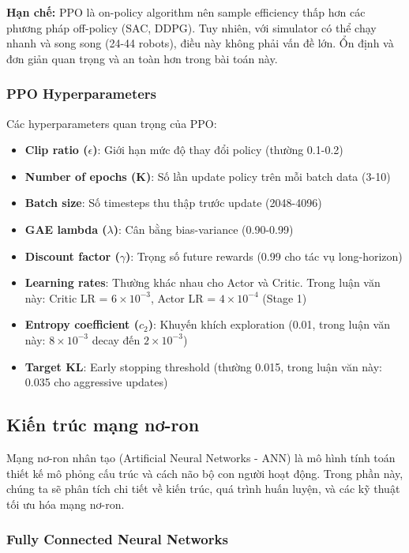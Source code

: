 \textbf{Hạn chế:} PPO là on-policy algorithm nên sample efficiency thấp hơn các phương pháp off-policy (SAC, DDPG). Tuy nhiên, với simulator có thể chạy nhanh và song song (24-44 robots), điều này không phải vấn đề lớn. Ổn định và đơn giản quan trọng và an toàn hơn trong bài toán này.

\subsubsection{PPO Hyperparameters}

Các hyperparameters quan trọng của PPO:

\begin{itemize}
\item \textbf{Clip ratio ($\epsilon$)}: Giới hạn mức độ thay đổi policy (thường 0.1-0.2)
\item \textbf{Number of epochs (K)}: Số lần update policy trên mỗi batch data (3-10)
\item \textbf{Batch size}: Số timesteps thu thập trước update (2048-4096)
\item \textbf{GAE lambda ($\lambda$)}: Cân bằng bias-variance (0.90-0.99)
\item \textbf{Discount factor ($\gamma$)}: Trọng số future rewards (0.99 cho tác vụ long-horizon)
\item \textbf{Learning rates}: Thường khác nhau cho Actor và Critic. Trong luận văn này: Critic LR = $6 \times 10^{-3}$, Actor LR = $4 \times 10^{-4}$ (Stage 1)
\item \textbf{Entropy coefficient ($c_2$)}: Khuyến khích exploration (0.01, trong luận văn này: $8 \times 10^{-3}$ decay đến $2 \times 10^{-3}$)
\item \textbf{Target KL}: Early stopping threshold (thường 0.015, trong luận văn này: 0.035 cho aggressive updates)
\end{itemize}

\subsection{Kiến trúc mạng nơ-ron}
\label{subsec:neural_networks}

Mạng nơ-ron nhân tạo (Artificial Neural Networks - ANN) là mô hình tính toán thiết kế mô phỏng cấu trúc và cách não bộ con người hoạt động. Trong phần này, chúng ta sẽ phân tích chi tiết về kiến trúc, quá trình huấn luyện, và các kỹ thuật tối ưu hóa mạng nơ-ron.

\subsubsection{Fully Connected Neural Networks}

